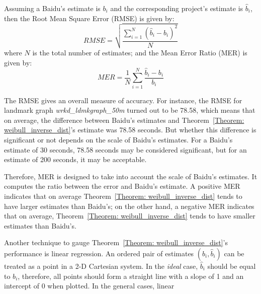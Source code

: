 \begin{table}[h!]
\centering
{}
\caption{Summary of Evaluation Results}\label{Ta:eval_res}
\end{table}

Assuming a Baidu's estimate is $b_{i}$ and the corresponding project's estimate is $\hat{b}_{i}$, then the Root Mean Square Error (RMSE) is given by:
\begin{equation}
RMSE = \sqrt{\frac{\sum_{i = 1}^{N}(\hat{b}_{i} - b_{i})^{2}}{N}}
\end{equation}
where $N$ is the total number of estimates; and the Mean Error Ratio (MER) is given by:
\begin{equation}
MER = \frac{1}{N}\sum_{i = 1}^{N}\frac{\hat{b}_{i} - b_{i}}{b_{i}}
\end{equation}

The RMSE gives an overall measure of accuracy. For instance, the RMSE for landmark graph \emph{wrkd\_ldmkgraph\_50m} turned out to be 78.58, which means that on average, the difference between Baidu's estimates and Theorem~\ref{Theorem: weibull_inverse_dist}'s estimate was 78.58 seconds. But whether this difference is significant or not depends on the scale of Baidu's estimates. For a Baidu's estimate of 30 seconds, 78.58 seconds may be considered significant, but for an estimate of 200 seconds, it may be acceptable. 

Therefore, MER is designed to take into account the scale of Baidu's estimates. It computes the ratio between the error and Baidu's estimate. A positive MER indicates that on average Theorem~\ref{Theorem: weibull_inverse_dist} tends to have larger estimates than Baidu's; on the other hand, a negative MER indicates that on average, Theorem~\ref{Theorem: weibull_inverse_dist} tends to have smaller estimates than Baidu's. 

Another technique to gauge Theorem~\ref{Theorem: weibull_inverse_dist}'s performance is linear regression. An ordered pair of estimates $(b_{i}, \hat{b}_{i})$ can be treated as a point in a 2-D Cartesian system. In the \emph{ideal} case, $\hat{b}_{i}$ should be equal to $b_{i}$, therefore, all points should form a straight line with a slope of 1 and an intercept of 0 when plotted. In the general cases, linear 

